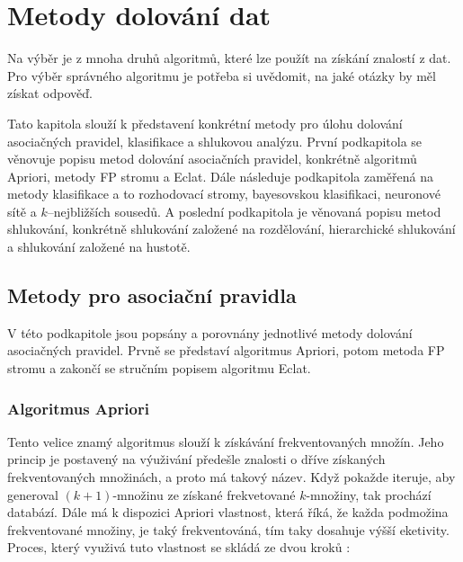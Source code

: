 \chapter{Metody dolování dat}
\label{metody}
Na výběr je z mnoha druhů algoritmů, které lze použít na získání znalostí z dat. Pro výběr správného algoritmu je potřeba si uvědomit, na jaké otázky by měl získat odpověď. 

Tato kapitola slouží k představení konkrétní metody pro úlohu dolování asociačných pravidel, klasifikace a shlukovou analýzu. První podkapitola se věnovuje popisu metod dolování asociačních pravidel, konkrétně algoritmů Apriori, metody FP stromu a Eclat. Dále následuje podkapitola zaměřená na metody klasifikace a to rozhodovací stromy, bayesovskou klasifikaci, neuronové sítě a $k$–nejbližších sousedů. A poslední podkapitola je věnovaná popisu metod shlukování, konkrétně shlukování založené na rozdělování, hierarchické shlukování a shlukování založené na hustotě.

\section{Metody pro asociační pravidla}
V této podkapitole jsou popsány a porovnány jednotlivé metody dolování asociačných pravidel. Prvně se představí algoritmus Apriori, potom metoda FP stromu a zakončí se stručním popisem algoritmu Eclat.

\subsection*{Algoritmus Apriori}
Tento velice znamý algoritmus slouží k získávání frekventovaných množín. Jeho princip je postavený na výuživání předešle znalosti o dříve získaných frekventovaných množinách, a proto má takový název. Když pokažde iteruje, aby generoval $(k+1)$-množinu ze získané frekvetované $k$-množiny, tak prochází databází. Dále má k dispozici Apriori vlastnost, která říká, že každa podmožina frekventované množiny, je taký frekventováná, tím taky dosahuje výšší eketivity. Proces, který využivá tuto vlastnost se skládá ze dvou kroků \cite{Han}:

